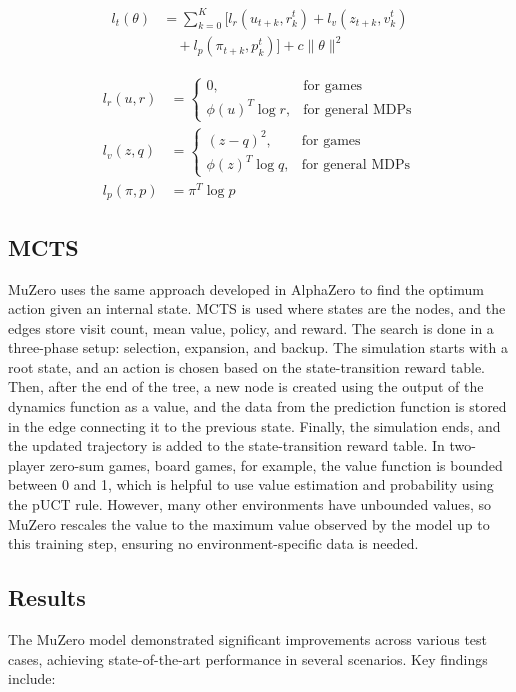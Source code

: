 \begin{align}
    l_t(\theta) & =
    \sum_{k=0}^K \big[ l_r(u_{t+k}, r_k^t) + l_v(z_{t+k}, v_k^t) \nonumber \\
                & \quad + l_p(\pi_{t+k}, p_k^t) \big] + c \|\theta\|^2
\end{align}

\begin{align}
    l_r(u, r)   & =
    \begin{cases}
        0,                & \text{for games}        \\
        \phi(u)^T \log r, & \text{for general MDPs}
    \end{cases} \\
    l_v(z, q)   & =
    \begin{cases}
        (z - q)^2,        & \text{for games}        \\
        \phi(z)^T \log q, & \text{for general MDPs}
    \end{cases} \\
    l_p(\pi, p) & = \pi^T \log p
\end{align}

\subsection{MCTS}
MuZero uses the same approach developed in AlphaZero to find the optimum action
given an internal state. MCTS is used where states are the nodes, and the edges
store visit count, mean value, policy, and reward. The search is done in a
three-phase setup: selection, expansion, and backup. The simulation starts with
a root state, and an action is chosen based on the state-transition reward
table. Then, after the end of the tree, a new node is created using the output
of the dynamics function as a value, and the data from the prediction function
is stored in the edge connecting it to the previous state. Finally, the
simulation ends, and the updated trajectory is added to the state-transition
reward table. In two-player zero-sum games, board games, for example, the value
function is bounded between 0 and 1, which is helpful to use value estimation
and probability using the pUCT rule. However, many other environments have
unbounded values, so MuZero rescales the value to the maximum value observed by
the model up to this training step, ensuring no environment-specific data is
needed.\cite{mz1}



\subsection{Results}
The MuZero model demonstrated significant improvements across various test
cases, achieving state-of-the-art performance in several scenarios. Key
findings include:

